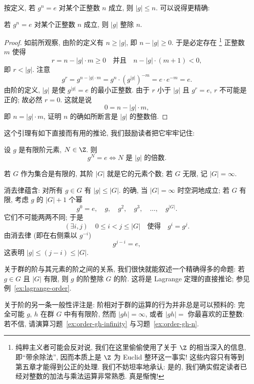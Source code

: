 按定义, 若 $g^n = e$ 对某个正整数 $n$ 成立, 则 $|g| \leq n$. 可以说得更精确:

\begin{lemma}
\label{lem:order-divides}
若 $g^n = e$ 对某个正整数 $n$ 成立, 则 $|g|$ 整除 $n$.
\end{lemma}

\begin{proof}
如前所观察, 由阶的定义有 $n \geq |g|$, 即 $n - |g| \geq 0$. 于是必定存在%
\footnote{纯粹主义者可能会反对说, 我们在这里偷偷使用了关于 $\Z$ 的相当深入的信息, 即``带余除法'', 因而本质上是 $\Z$ 为 Euclid 整环这一事实! 这些内容只有等到第五章才能得到公正的处理. 我们不妨坦率地承认: 是的, 我们确实假定读者已经对整数的加法与乘法运算非常熟悉. 真是惭愧!}%
正整数 $m$ 使得
\[
r = n - |g| \cdot m \geq 0 \quad \text{并且} \quad n - |g| \cdot (m+1) < 0,
\]
即 $r < |g|$. 注意
\[
g^r = g^{n - |g| \cdot m} = g^n \cdot (g^{|g|})^{-m} = e \cdot e^{-m} = e.
\]
由阶的定义, $|g|$ 是使 $g^{|g|} = e$ 的最小正整数. 由于 $r$ 小于 $|g|$ 且 $g^r = e$, $r$ 不可能是正的; 故必然 $r = 0$. 这就是说
\[
0 = n - |g| \cdot m,
\]
即 $n = |g| \cdot m$, 证明 $n$ 的确如所断言是 $|g|$ 的整数倍.
\end{proof}

这个引理有如下直接而有用的推论, 我们鼓励读者把它牢牢记住:

\begin{corollary}
\label{cor:order-multiple}
设 $g$ 是有限阶元素, $N \in \Z$. 则
\[
g^N = e \iff N \text{ 是 } |g| \text{ 的倍数}.
\]
\end{corollary}

\begin{definition}
\label{def:order-group}
若 $G$ 作为集合是有限的, 其阶%
$|G|$ 就是它的元素个数; 若 $G$ 无限, 记 $|G| = \infty$.
\end{definition}

消去律蕴含: 对所有 $g \in G$ 有 $|g| \leq |G|$. 的确, 当 $|G| = \infty$ 时空洞地成立; 若 $G$ 有限, 考虑 $g$ 的 $|G| + 1$ 个幂
\[
g^0 = e, \quad g, \quad g^2, \quad g^3, \quad \ldots, \quad g^{|G|}.
\]
它们不可能两两不同; 于是
\[
(\exists i, j) \quad 0 \leq i < j \leq |G| \quad \text{使得} \quad g^i = g^j.
\]
由消去律 (即在右侧乘以 $g^{-i}$)
\[
g^{j-i} = e,
\]
这表明 $|g| \leq (j - i) \leq |G|$.

关于群的阶与其元素的阶之间的关系, 我们很快就能叙述一个精确得多的命题: 若 $g \in G$ 且 $|G|$ 有限, 则 $g$ 的阶整除 $G$ 的阶. 这将是 Lagrange 定理的直接推论; 参见例~\ref{ex:lagrange-order}.

关于阶的另一条一般性评注是: 阶相对于群的运算的行为并非总是可以预料的: 完全可能 $g$, $h$ 在群 $G$ 中有有限阶, 然而 $|gh| = \infty$, 或者 $|gh| = $ 你最喜欢的正整数: 若不信, 请演算习题~\ref{ex:order-gh-infinity} 与习题~\ref{ex:order-gh-n}.


